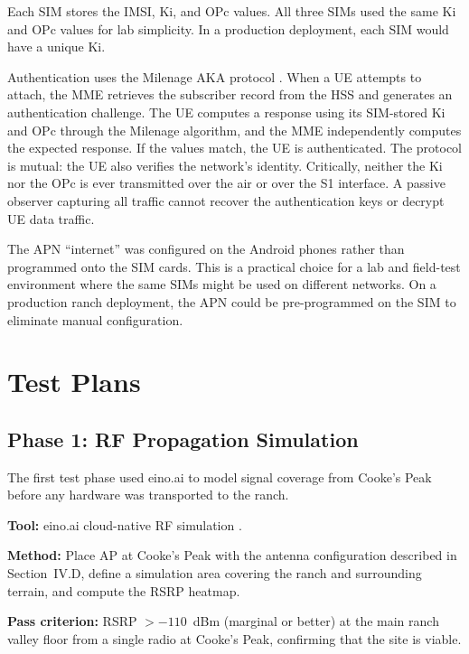 \documentclass[
    left=1.5in,
    right=1.25in,
    top=1.25in,
    bottom=1.25in
]{CalPolySeniorProject}
\begin{document}
Each SIM stores the IMSI, Ki, and OPc values. All three SIMs used the same Ki
and OPc values for lab simplicity. In a production deployment, each SIM would
have a unique Ki.

Authentication uses the Milenage AKA protocol \autocite{hpe2019cbrssignaling}.
When a UE attempts to attach, the MME retrieves the subscriber record from the
HSS and generates an authentication challenge. The UE computes a response using
its SIM-stored Ki and OPc through the Milenage algorithm, and the MME
independently computes the expected response. If the values match, the UE is
authenticated. The protocol is mutual: the UE also verifies the network's
identity. Critically, neither the Ki nor the OPc is ever transmitted over the
air or over the S1 interface. A passive observer capturing all traffic cannot
recover the authentication keys or decrypt UE data traffic.

The APN ``internet'' was configured on the Android phones rather than programmed
onto the SIM cards. This is a practical choice for a lab and field-test
environment where the same SIMs might be used on different networks. On a
production ranch deployment, the APN could be pre-programmed on the SIM to
eliminate manual configuration.

\section{Test Plans}

\subsection{Phase 1: RF Propagation Simulation}

The first test phase used eino.ai to model signal coverage from Cooke's Peak
before any hardware was transported to the ranch.

\textbf{Tool:} eino.ai cloud-native RF simulation \autocite{einoai2024}.

\textbf{Method:} Place AP at Cooke's Peak with the antenna configuration
described in Section~IV.D, define a simulation area covering the ranch and
surrounding terrain, and compute the RSRP heatmap.

\textbf{Pass criterion:} RSRP $>-110$~dBm (marginal or better) at the main
ranch valley floor from a single radio at Cooke's Peak, confirming that the
site is viable.
\end{document}
